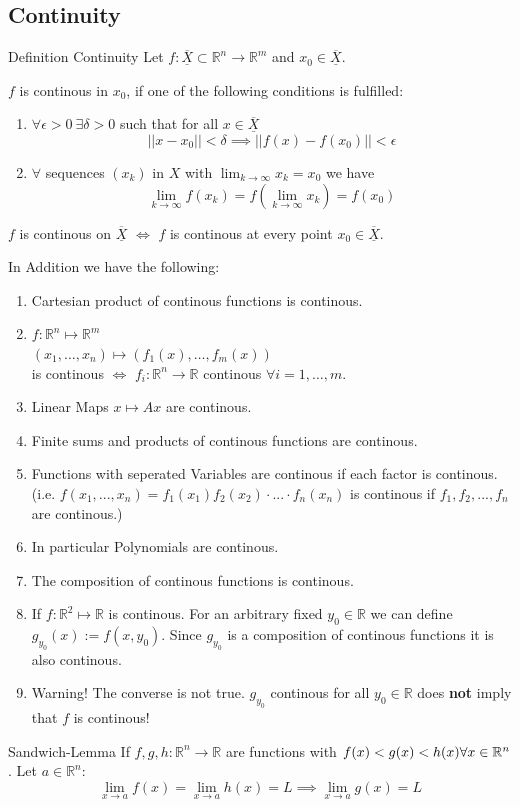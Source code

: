 \documentclass[a4paper,fontsize = 8pt]{scrartcl}
\def\R{\mathbb{R}}
\def\X{\underline{\overline{X}}}
\begin{document}
\subsection{Continuity}
\begin{mainbox}{Definition Continuity}
    Let \(f: \X \subset \R^n \to \R^m\)  and \(x_0 \in \X\). 
    
    \(f\) is continous in \(x_0\), if one of the following conditions is fulfilled:
    \begin{enumerate}
        \item \(\forall \epsilon > 0 \ \exists \delta > 0\) such that for all \(x \in \X\) \[||x - x_0|| < \delta \implies ||f(x) - f(x_0)|| < \epsilon\]
        \item \(\forall\) sequences \((x_k)\) in \(X\) with \(\lim_{k \to \infty} x_k = x_0\) we have \[\lim_{k \to \infty} f(x_k) = f\left(\lim_{k \to \infty} x_k\right) = f(x_0)\]
    \end{enumerate}
\end{mainbox}
\(f\) is continous on \(\X\) $\iff$ \(f\) is continous at every point \(x_0 \in \X\). 

In Addition we have the following:
\begin{enumerate}
  \item Cartesian product of continous functions is continous.
  \item \(f: \R^n \mapsto \R^m\)\\
  \((x_1, \ldots, x_n) \mapsto (f_1(x),\ldots,f_m(x))\) \\is continous $\iff$ \(f_i: \R^n \to \R\) continous \(\forall i = 1, \ldots, m\).
  \item Linear Maps \(x \mapsto Ax\) are continous.
  \item Finite sums and products of continous functions are continous.
  \item Functions with seperated Variables are continous if each factor is continous. (i.e. $f(x_1,...,x_n) = f_1(x_1)f_2(x_2)\cdot...\cdot f_n(x_n)$ is continous if $f_1, f_2, ..., f_n$ are continous.)
  \item In particular Polynomials are continous.
  \item The composition of continous functions is continous.
  \item If $f: \R^2 \mapsto \R$ is continous. For an arbitrary fixed $y_0 \in \R$ we can define $g_{y_0}(x) := f(x, y_0)$. Since $g_{y_0}$ is a composition of continous functions it is also continous. 
  \item Warning! The converse is not true. $g_{y_0}$ continous for all $y_0 \in \R$ does \textbf{not} imply that  $f$ is continous!
\end{enumerate}
\begin{mainbox}{Sandwich-Lemma}
  If \(f, g, h: \R^n \to \R\) are functions with \(f(x) < g(x) < h(x) \\ \forall x \in \R^n\). Let $a \in \R^n$:
  \[\lim_{x\to a} f(x) = \lim_{x \to a} h(x) = L \implies \lim_{x\to a} g(x) = L\]
\end{mainbox}
\end{document}
